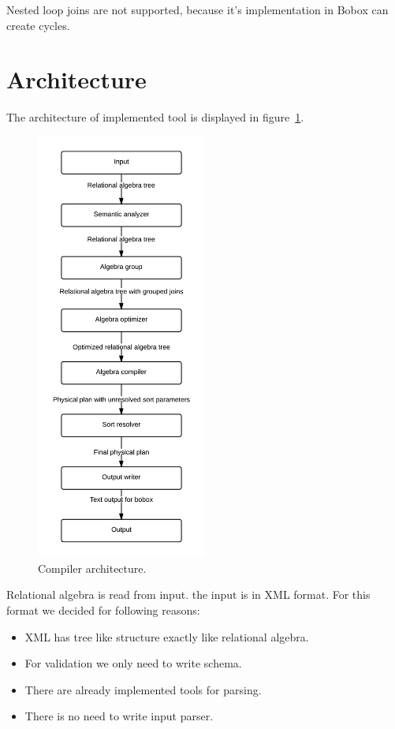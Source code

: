 Nested loop joins are not supported, because it's implementation in Bobox can create cycles.

\section{Architecture}
The architecture of implemented tool is displayed in figure~\ref{fig:compilerarchitecture}.

\begin{figure}[h!]
  \centering
    \includegraphics[width=0.5\textwidth]{compilerarchitecture}

      \caption{Compiler architecture.}
          \label{fig:compilerarchitecture}
\end{figure}

Relational algebra is read from input. the input is in XML format. For this format we decided for following reasons:
\begin{itemize}
\item XML has tree like structure exactly like relational algebra.
\item For validation we only need to write schema.
\item There are already implemented tools for parsing.
\item There is no need to write input parser.
\end{itemize}

